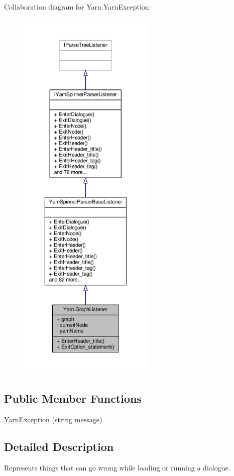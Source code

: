 Collaboration diagram for Yarn.\-Yarn\-Exception\-:
\nopagebreak
\begin{figure}[H]
\begin{center}
\leavevmode
\includegraphics[width=184pt]{a00587}
\end{center}
\end{figure}
\subsection*{Public Member Functions}
\begin{DoxyCompactItemize}
\item 
\hyperlink{a00184_aa4a1dc51efdfa238aad7f20d76710fd1}{Yarn\-Exception} (string message)
\end{DoxyCompactItemize}


\subsection{Detailed Description}
Represents things that can go wrong while loading or running a dialogue. 

